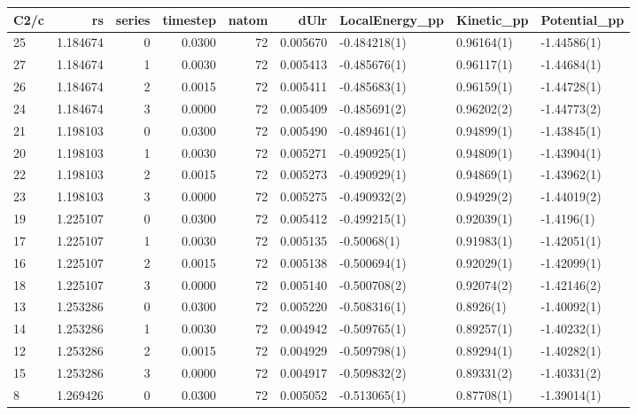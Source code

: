 \begin{tabular}{lrrrrrlll}
\toprule
C2/c &        rs &  series &  timestep &  natom &      dUlr & LocalEnergy\_pp &  Kinetic\_pp & Potential\_pp \\
\midrule
25 &  1.184674 &       0 &    0.0300 &     72 &  0.005670 &   -0.484218(1) &  0.96164(1) &  -1.44586(1) \\
27 &  1.184674 &       1 &    0.0030 &     72 &  0.005413 &   -0.485676(1) &  0.96117(1) &  -1.44684(1) \\
26 &  1.184674 &       2 &    0.0015 &     72 &  0.005411 &   -0.485683(1) &  0.96159(1) &  -1.44728(1) \\
24 &  1.184674 &       3 &    0.0000 &     72 &  0.005409 &   -0.485691(2) &  0.96202(2) &  -1.44773(2) \\
21 &  1.198103 &       0 &    0.0300 &     72 &  0.005490 &   -0.489461(1) &  0.94899(1) &  -1.43845(1) \\
20 &  1.198103 &       1 &    0.0030 &     72 &  0.005271 &   -0.490925(1) &  0.94809(1) &  -1.43904(1) \\
22 &  1.198103 &       2 &    0.0015 &     72 &  0.005273 &   -0.490929(1) &  0.94869(1) &  -1.43962(1) \\
23 &  1.198103 &       3 &    0.0000 &     72 &  0.005275 &   -0.490932(2) &  0.94929(2) &  -1.44019(2) \\
19 &  1.225107 &       0 &    0.0300 &     72 &  0.005412 &   -0.499215(1) &  0.92039(1) &   -1.4196(1) \\
17 &  1.225107 &       1 &    0.0030 &     72 &  0.005135 &    -0.50068(1) &  0.91983(1) &  -1.42051(1) \\
16 &  1.225107 &       2 &    0.0015 &     72 &  0.005138 &   -0.500694(1) &  0.92029(1) &  -1.42099(1) \\
18 &  1.225107 &       3 &    0.0000 &     72 &  0.005140 &   -0.500708(2) &  0.92074(2) &  -1.42146(2) \\
13 &  1.253286 &       0 &    0.0300 &     72 &  0.005220 &   -0.508316(1) &   0.8926(1) &  -1.40092(1) \\
14 &  1.253286 &       1 &    0.0030 &     72 &  0.004942 &   -0.509765(1) &  0.89257(1) &  -1.40232(1) \\
12 &  1.253286 &       2 &    0.0015 &     72 &  0.004929 &   -0.509798(1) &  0.89294(1) &  -1.40282(1) \\
15 &  1.253286 &       3 &    0.0000 &     72 &  0.004917 &   -0.509832(2) &  0.89331(2) &  -1.40331(2) \\
8  &  1.269426 &       0 &    0.0300 &     72 &  0.005052 &   -0.513065(1) &  0.87708(1) &  -1.39014(1) \\

\end{tabular}

